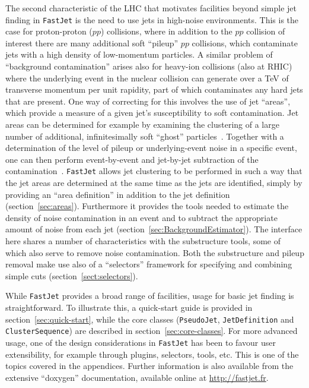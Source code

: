 \documentclass[12pt,a4]{article}
\newcommand{\fastjet}{\texttt{FastJet}\xspace}
\newcommand{\ttt}[1]{{\small\texttt{#1}}}
\begin{document}
The second characteristic of the LHC that motivates facilities beyond
simple jet finding in \fastjet is the need to use jets in high-noise
environments.
%
This is the case for proton-proton ($pp$) collisions, where in
addition to the $pp$ collision of interest there are many additional
soft ``pileup'' $pp$ collisions, which contaminate jets with a high
density of low-momentum particles.
%
A similar problem of ``background contamination'' arises also for
heavy-ion collisions (also at RHIC) where the underlying event in the
nuclear collision can generate over a TeV of transverse momentum per
unit rapidity, part of which contaminates any hard jets that are
present.
%
One way of correcting for this involves the use of jet ``areas'',
which provide a measure of a given jet's susceptibility to soft
contamination.
%
Jet areas can be determined for example by examining the clustering of
a large number of additional, infinitesimally soft ``ghost''
particles~\cite{CSSAreas}.
%
Together with a determination of the level of pileup or
underlying-event noise in a specific event, one can then perform
event-by-event and 
jet-by-jet subtraction of the
contamination~\cite{cs,Cacciari:2010te}. 
%
\fastjet allows jet clustering to be performed in such a way that the
jet areas are determined at the same time as the jets are identified,
simply by providing an ``area definition'' in addition to the jet
definition (section~\ref{sec:areas}).
%
Furthermore it provides the tools needed to estimate the density of
noise contamination in an event and to subtract the appropriate amount
of noise from each jet (section~\ref{sec:BackgroundEstimator}).
%
The interface here shares a number of characteristics with the
substructure tools, some of which also serve to remove noise
contamination. Both the substructure and pileup removal make use
also of a ``selectors'' framework for specifying and combining simple
cuts (section~\ref{sect:selectors}).

While \fastjet provides a broad range of facilities, usage for basic
jet finding is straightforward.
%
To illustrate this, a quick-start guide is provided in
section~\ref{sec:quick-start}, while the core classes
(\ttt{PseudoJet}, \ttt{JetDefinition} and \ttt{ClusterSequence}) are
described in section~\ref{sec:core-classes}.
%
For more advanced usage, one of the design considerations in \fastjet
has been to favour user extensibility, for example through plugins,
selectors, tools, etc. This is one of the topics covered in the
appendices.
%
Further information is also available from the extensive 
``doxygen'' documentation, available online at
\url{http://fastjet.fr}.
\end{document}
